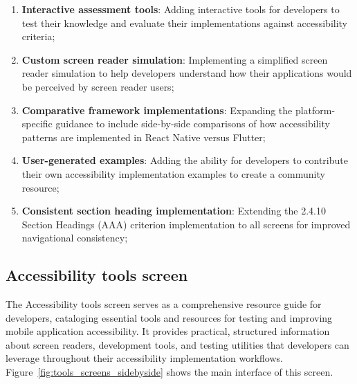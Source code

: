 \begin{enumerate}
    \item \textbf{Interactive assessment tools}: Adding interactive tools for developers to test their knowledge and evaluate their implementations against accessibility criteria;
    
    \item \textbf{Custom screen reader simulation}: Implementing a simplified screen reader simulation to help developers understand how their applications would be perceived by screen reader users;
    
    \item \textbf{Comparative framework implementations}: Expanding the platform-specific guidance to include side-by-side comparisons of how accessibility patterns are implemented in React Native versus Flutter;
    
    \item \textbf{User-generated examples}: Adding the ability for developers to contribute their own accessibility implementation examples to create a community resource;
    
    \item \textbf{Consistent section heading implementation}: Extending the 2.4.10 Section Headings (AAA) criterion implementation to all screens for improved navigational consistency;

\end{enumerate}

\subsection{Accessibility tools screen}
\label{subsec:tools-screen}

The Accessibility tools screen serves as a comprehensive resource guide for developers, cataloging essential tools and resources for testing and improving mobile application accessibility. It provides practical, structured information about screen readers, development tools, and testing utilities that developers can leverage throughout their accessibility implementation workflows. Figure~\ref{fig:tools_screens_sidebyside} shows the main interface of this screen.

